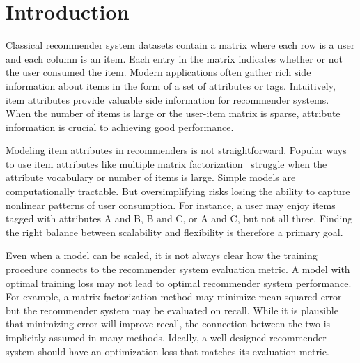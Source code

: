 \section{Introduction}
\label{sec:introduction}
Classical recommender system datasets contain a matrix where each row is a user
and each column is an item. Each entry in the matrix indicates whether or not
the user consumed the item. Modern applications often gather rich side
information about items in the form of a set of attributes or tags. Intuitively,
item attributes provide valuable side information for recommender systems. When
the number of items is large or the user-item matrix is sparse, attribute
information is crucial to achieving good performance.

Modeling item attributes in recommenders is not straightforward. Popular ways to
use item attributes like multiple matrix
factorization~\cite{wang2011collaborative,gopalan2014content-based} struggle
when the attribute vocabulary or number of items is large. Simple models are
computationally tractable. But oversimplifying risks losing the ability to
capture nonlinear patterns of user consumption. For instance, a user may enjoy
items tagged with attributes A and B, B and C, or A and C, but not all three.
Finding the right balance between scalability and flexibility is therefore a
primary goal.

Even when a model can be scaled, it is not always clear how the training
procedure connects to the recommender system evaluation metric. A model with
optimal training loss may not lead to optimal recommender system performance.
For example, a matrix factorization method may minimize mean squared error but
the recommender system may be evaluated on recall. While it is plausible that
minimizing error will improve recall, the connection between the two is
implicitly assumed in many methods. Ideally, a well-designed recommender system
should have an optimization loss that matches its evaluation metric.


